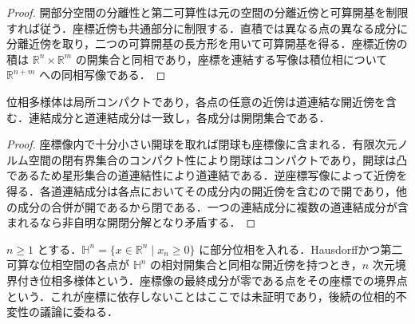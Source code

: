 \begin{proof}
開部分空間の分離性と第二可算性は元の空間の分離近傍と可算開基を制限すれば従う．座標近傍も共通部分に制限する．直積では異なる点の異なる成分に分離近傍を取り，二つの可算開基の長方形を用いて可算開基を得る．座標近傍の積は $\mathbb R^n\times\mathbb R^m$ の開集合と同相であり，座標を連結する写像は積位相について $\mathbb R^{n+m}$ への同相写像である．
\end{proof}
\begin{prop}[位相多様体の局所的性質]
位相多様体は局所コンパクトであり，各点の任意の近傍は道連結な開近傍を含む．連結成分と道連結成分は一致し，各成分は開閉集合である．
\end{prop}
\begin{proof}
座標像内で十分小さい開球を取れば閉球も座標像に含まれる．有限次元ノルム空間の閉有界集合のコンパクト性により閉球はコンパクトであり，開球は凸であるため星形集合の道連結性により道連結である．逆座標写像によって近傍を得る．各道連結成分は各点においてその成分内の開近傍を含むので開であり，他の成分の合併が開であるから閉である．一つの連結成分に複数の道連結成分が含まれるなら非自明な開閉分解となり矛盾する．
\end{proof}
\begin{defn}[境界付き位相多様体]
$n\geq1$ とする．$\mathbb H^n=\{x\in\mathbb R^n\mid x_n\geq0\}$ に部分位相を入れる．Hausdorffかつ第二可算な位相空間の各点が $\mathbb H^n$ の相対開集合と同相な開近傍を持つとき，$n$ 次元境界付き位相多様体という．座標像の最終成分が零である点をその座標での境界点という．これが座標に依存しないことはここでは未証明であり，後続の位相的不変性の議論に委ねる．
\end{defn}
